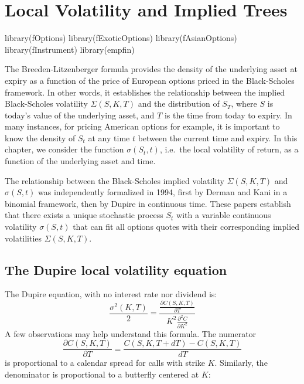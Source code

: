 \documentclass[]{tufte-book}
\date{}
\newenvironment{Shaded}{}{}
\newcommand{\FunctionTok}[1]{\textcolor[rgb]{0.02,0.16,0.49}{#1}}
\newcommand{\NormalTok}[1]{#1}
\begin{document}
{
\setcounter{tocdepth}{0}
\tableofcontents
}

\hypertarget{local-volatility-and-implied-trees}{%
\chapter{Local Volatility and Implied Trees}\label{local-volatility-and-implied-trees}}

\begin{Shaded}
\begin{Highlighting}[]
  \FunctionTok{library}\NormalTok{(fOptions)}
  \FunctionTok{library}\NormalTok{(fExoticOptions)}
  \FunctionTok{library}\NormalTok{(fAsianOptions)}
  \FunctionTok{library}\NormalTok{(fInstrument)}
  \FunctionTok{library}\NormalTok{(empfin)}
\end{Highlighting}
\end{Shaded}

The Breeden-Litzenberger formula provides the density of the underlying
asset at expiry as a function of the price of European options priced in the Black-Scholes
framework. In other words, it establishes the relationship between the implied Black-Scholes
volatility \(\Sigma(S, K, T)\) and the distribution of \(S_T\), where \(S\) is today's value of the underlying asset, and \(T\) is the time from today to expiry. In many instances, for
pricing American options for example, it is important to know the
density of \(S_t\) at any time \(t\) between the current time and expiry. In this
chapter, we consider the function \(\sigma(S_t,t)\), i.e.~the
local volatility of return, as a function of the underlying asset and time.

The relationship between the Black-Scholes implied volatility \(\Sigma(S,K,T)\) and \(\sigma(S,t)\) was
independently formalized in 1994, first by Derman and Kani in a binomial framework, then by Dupire in continuous time.
These papers establish that there exists a unique stochastic process \(S_t\) with a variable continuous volatility \(\sigma(S,t)\) that can fit all options quotes with their corresponding implied volatilities \(\Sigma(S,K,T)\).

\hypertarget{the-dupire-local-volatility-equation}{%
\section{The Dupire local volatility equation}\label{the-dupire-local-volatility-equation}}

The Dupire equation, with no interest rate nor dividend is:
\[
\frac{\sigma^2(K,T)}{2} = \frac{\frac{\partial C(S,K,T)}{\partial T}}{K^2 \frac{\partial^2C}{\partial K^2}}
\]
A few observations may help understand this formula. The numerator
\[
\frac{\partial C(S,K,T)}{\partial T} = \frac{C(S,K,T+dT)-C(S,K,T)}{dT}
\]
is proportional to a calendar spread for calls with strike \(K\). Similarly, the denominator is proportional to a butterfly centered at \(K\):
\end{document}
